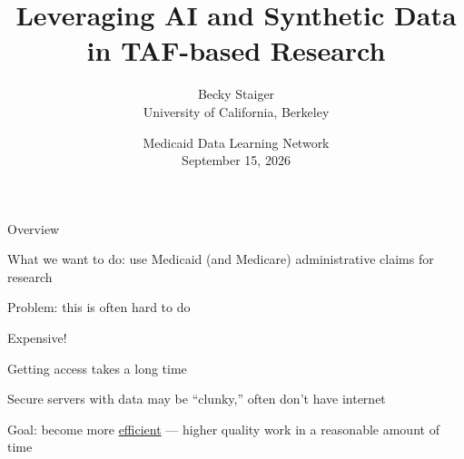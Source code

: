 \documentclass[notes,11pt, aspectratio=169, xcolor={table}]{beamer}
\title{Leveraging AI and Synthetic Data in TAF-based Research}
\author[shortname]{Becky Staiger\\
\normalsize{University of California, Berkeley\\}}
\date{Medicaid Data Learning Network \\ September 15, 2026}
\newenvironment{wideitemize}{\itemize\addtolength{\itemsep}{3pt}}{\enditemize}
\begin{document}
\begin{frame}[plain]
\maketitle
\end{frame}

\begin{frame}{Overview}

\begin{wideitemize}
\item What we want to do: use Medicaid (and Medicare) administrative claims for research
\item Problem: this is often hard to do
\begin{wideitemize}
\item Expensive!
\item Getting access takes a long time
\item Secure servers with data may be ``clunky,'' often don't have internet
\end{wideitemize}
\item Goal: become more \underline{efficient} --- higher quality work in a reasonable amount of time
\end{wideitemize}
\end{frame}
\end{document}
